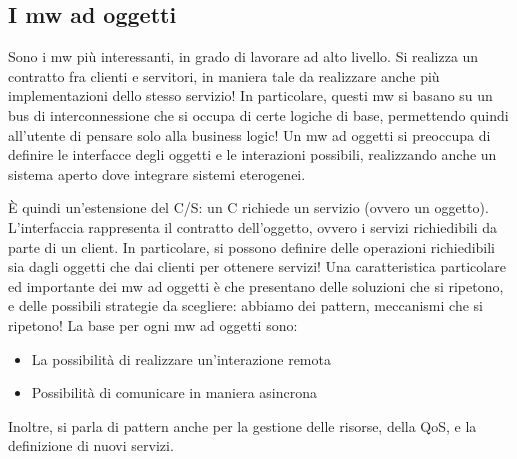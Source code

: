 \subsection{I mw ad oggetti}
Sono i mw più interessanti, in grado di lavorare ad alto livello. Si realizza un contratto fra clienti e servitori, 
in maniera tale da realizzare anche più implementazioni dello stesso servizio! In particolare, questi mw si basano su
un bus di interconnessione che si occupa di certe logiche di base, permettendo quindi all'utente di pensare solo alla
business logic! Un mw ad oggetti si preoccupa di definire le interfacce degli oggetti e le interazioni possibili,
realizzando anche un sistema aperto dove integrare sistemi eterogenei.

È quindi un'estensione del C/S: un C richiede un servizio (ovvero un oggetto). L'interfaccia rappresenta il contratto
dell'oggetto, ovvero i servizi richiedibili da parte di un client. In particolare, si possono definire delle operazioni
richiedibili sia dagli oggetti che dai clienti per ottenere servizi!
Una caratteristica particolare ed importante dei mw ad oggetti è che presentano delle soluzioni che si ripetono, e 
delle possibili strategie da scegliere: abbiamo dei pattern, meccanismi che si ripetono!
La base per ogni mw ad oggetti sono:
\begin{itemize}
 \item La possibilità di realizzare un'interazione remota
 \item Possibilità di comunicare in maniera asincrona
\end{itemize}
Inoltre, si parla di pattern anche per la gestione delle risorse, della QoS, e la definizione di nuovi servizi.
